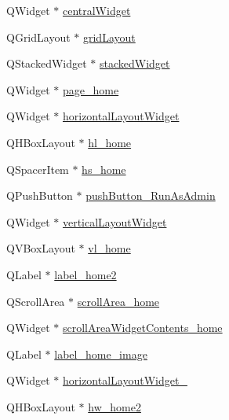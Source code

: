 \begin{DoxyCompactItemize}
\item 
Q\+Widget $\ast$ \hyperlink{class_ui___main_window_a30075506c2116c3ed4ff25e07ae75f81}{central\+Widget}
\item 
Q\+Grid\+Layout $\ast$ \hyperlink{class_ui___main_window_a525ed3c5fe0784ac502ee222fba4e205}{grid\+Layout}
\item 
Q\+Stacked\+Widget $\ast$ \hyperlink{class_ui___main_window_a8d440a6df1de0bc57afcdda7476d8f19}{stacked\+Widget}
\item 
Q\+Widget $\ast$ \hyperlink{class_ui___main_window_aa4f77f035d6ed3a7e76fb170615d1286}{page\+\_\+home}
\item 
Q\+Widget $\ast$ \hyperlink{class_ui___main_window_a9271976c4376de565bfe96c296f4db1e}{horizontal\+Layout\+Widget}
\item 
Q\+H\+Box\+Layout $\ast$ \hyperlink{class_ui___main_window_ab25b99fa10ac535a6fc9050c871422bd}{hl\+\_\+home}
\item 
Q\+Spacer\+Item $\ast$ \hyperlink{class_ui___main_window_aaf3a8940c4debcf4d67865abb18db39b}{hs\+\_\+home}
\item 
Q\+Push\+Button $\ast$ \hyperlink{class_ui___main_window_a855a5311be36dd011437dbdb2cecb3ab}{push\+Button\+\_\+\+Run\+As\+Admin}
\item 
Q\+Widget $\ast$ \hyperlink{class_ui___main_window_a805d415fff07a22a85219e1f22f2da28}{vertical\+Layout\+Widget}
\item 
Q\+V\+Box\+Layout $\ast$ \hyperlink{class_ui___main_window_aeef7033b032cc8e168977cab53c55d89}{vl\+\_\+home}
\item 
Q\+Label $\ast$ \hyperlink{class_ui___main_window_aba327e1cd8282f5443f16641c170b4f6}{label\+\_\+home2}
\item 
Q\+Scroll\+Area $\ast$ \hyperlink{class_ui___main_window_a08be3a79893a97441e00358b28229e04}{scroll\+Area\+\_\+home}
\item 
Q\+Widget $\ast$ \hyperlink{class_ui___main_window_a46153cbaa49c175561034b9d85eb02bc}{scroll\+Area\+Widget\+Contents\+\_\+home}
\item 
Q\+Label $\ast$ \hyperlink{class_ui___main_window_ae8c543a4344ef646177b0ae2591e2d6e}{label\+\_\+home\+\_\+image}
\item 
Q\+Widget $\ast$ \hyperlink{class_ui___main_window_aeb6cecb6a82e31743d3b70d4efb7257b}{horizontal\+Layout\+Widget\+\_}
\item 
Q\+H\+Box\+Layout $\ast$ \hyperlink{class_ui___main_window_a035862211cd12b4d8cd1352fd7c14a63}{hw\+\_\+home2}

\end{DoxyCompactItemize}
